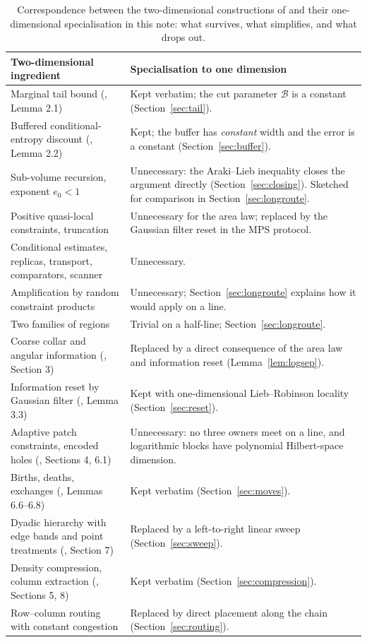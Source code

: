 \documentclass[aps,prx,reprint,superscriptaddress,floatfix,nofootinbib,longbibliography,amsmath,amssymb]{revtex4-2}
\theoremstyle{plain}
\theoremstyle{definition}
\begin{document}
\begin{table}[t]
\centering\small
\begin{tabular}{@{}p{}p{}@{}}
\toprule
Two-dimensional ingredient & Specialisation to one dimension\\
\midrule
Marginal tail bound (\cite{AL}, Lemma 2.1) & Kept verbatim; the cut parameter $\mathcal B$ is a constant (Section~\ref{sec:tail}).\\
Buffered conditional-entropy discount (\cite{AL}, Lemma 2.2) & Kept; the buffer has \emph{constant} width and the error is a constant (Section~\ref{sec:buffer}).\\
Sub-volume recursion, exponent $e_0<1$ & Unnecessary: the Araki--Lieb inequality closes the argument directly (Section~\ref{sec:closing}). Sketched for comparison in Section~\ref{sec:longroute}.\\
Positive quasi-local constraints, truncation & Unnecessary for the area law; replaced by the Gaussian filter reset in the MPS protocol.\\
Conditional estimates, replicas, transport, comparators, scanner & Unnecessary.\\
Amplification by random constraint products & Unnecessary; Section~\ref{sec:longroute} explains how it would apply on a line.\\
Two families of regions & Trivial on a half-line; Section~\ref{sec:longroute}.\\
\midrule
Coarse collar and angular information (\cite{PP}, Section 3) & Replaced by a direct consequence of the area law and information reset (Lemma~\ref{lem:logsep}).\\
Information reset by Gaussian filter (\cite{PP}, Lemma 3.3) & Kept with one-dimensional Lieb--Robinson locality (Section~\ref{sec:reset}).\\
Adaptive patch constraints, encoded holes (\cite{PP}, Sections 4, 6.1) & Unnecessary: no three owners meet on a line, and logarithmic blocks have polynomial Hilbert-space dimension.\\
Births, deaths, exchanges (\cite{PP}, Lemmas 6.6--6.8) & Kept verbatim (Section~\ref{sec:moves}).\\
Dyadic hierarchy with edge bands and point treatments (\cite{PP}, Section 7) & Replaced by a left-to-right linear sweep (Section~\ref{sec:sweep}).\\
Density compression, column extraction (\cite{PP}, Sections 5, 8) & Kept verbatim (Section~\ref{sec:compression}).\\
Row--column routing with constant congestion & Replaced by direct placement along the chain (Section~\ref{sec:routing}).\\
\bottomrule
\end{tabular}
\caption{Correspondence between the two-dimensional constructions of \cite{AL,PP} and their one-dimensional specialisation in this note: what survives, what simplifies, and what drops out.}
\label{tab:map}
\end{table}
\end{document}
